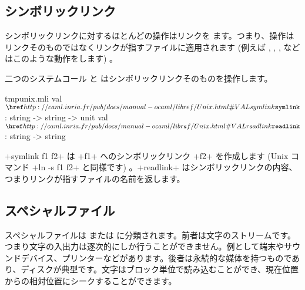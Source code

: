 \subsection*{シンボリックリンク}

シンボリックリンクに対するほとんどの操作はリンクを  ます。つまり、操作はリンクそのものではなくリンクが指すファイルに適用されます (例えば , , ,  などはこのような動作をします) 。

二つのシステムコール  と  はシンボリックリンクそのものを操作します。
%
\begin{listingcodefile}{tmpunix.mli}
val $\libvalue{Unix}{symlink}$  : string -> string -> unit
val $\libvalue{Unix}{readlink}$ : string -> string
\end{listingcodefile}
%
\ml+symlink f1 f2+ は \ml+f1+ へのシンボリックリンク \ml+f2+ を作成します (Unix コマンド \ml+ln -s f1 f2+ と同様です) 。\ml+readlink+ はシンボリックリンクの内容、つまりリンクが指すファイルの名前を返します。

\subsection*{\label{sec/speciaux}スペシャルファイル}

スペシャルファイルは  または  に分類されます。前者は文字のストリームです。つまり文字の入出力は逐次的にしか行うことができません。例として端末やサウンドデバイス、プリンターなどがあります。後者は永続的な媒体を持つものであり、ディスクが典型です。文字はブロック単位で読み込むことができ、現在位置からの相対位置にシークすることができます。

